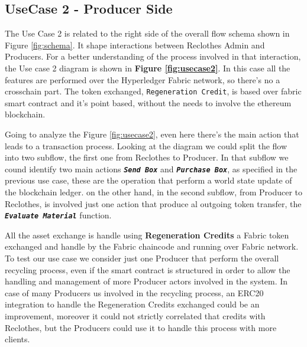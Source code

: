\subsection{UseCase 2 - Producer Side}

The Use Case 2 is related to the right side of the overall flow schema shown in Figure \ref{fig:schema}.
It shape interactions between Reclothes Admin and Producers. For a better understanding of the process 
involved in that interaction, the Use case 2 diagram is shown in \textbf{Figure \ref{fig:usecase2}}.
In this case all the features are performed over the Hyperledger Fabric network, so there's no 
a crosschain part. The token exchanged, \texttt{Regeneration Credit}, is based over fabric smart contract
 and it's point based, without the needs to involve the ethereum blockchain.

\bigskip 
Going to analyze the Figure \ref{fig:usecase2}, even here there's the main action that leads to a transaction
process. Looking at the diagram we could split the flow into two subflow, the first one from Reclothes
 to Producer. In that subflow we cound identify two main actions \textbf{\texttt{\textit{Send Box}}} and \textbf{\texttt{\textit{Purchase Box}}}, 
 as specified in the previous use case, these are the operation that perform a world state update of the 
 blockchain ledger. on the other hand, in the second subflow, from Producer to Reclothes, is involved just 
 one action that produce al outgoing token transfer, the \textbf{\texttt{\textit{Evaluate Material}}} function. 

\bigskip 
All the asset exchange is handle using \textbf{Regeneration Credits} a Fabric token exchanged
and handle by the Fabric chaincode and running over Fabric network. To test our use case we consider
just one Producer that perform the overall recycling process, even if the smart contract is structured
in order to allow the handling and management of more Producer actors involved in the system. In case
of many Producers us involved in the recycling process, an ERC20 integration to handle the Regeneration
Credits exchanged could be an improvement, moreover it could not strictly correlated that credits
with Reclothes, but the Producers could use it to handle this process with more clients. 


